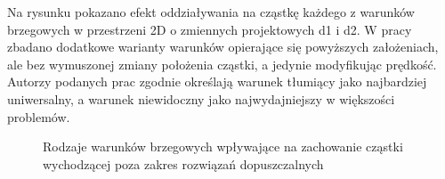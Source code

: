 Na rysunku pokazano efekt oddziaływania na cząstkę każdego z warunków brzegowych w przestrzeni 2D o zmiennych projektowych d1 i d2. W pracy \parencite{Xu2007} zbadano dodatkowe warianty warunków opierające się powyższych założeniach, ale bez wymuszonej zmiany położenia cząstki, a jedynie modyfikując prędkość. Autorzy podanych prac zgodnie określają warunek tłumiący jako najbardziej uniwersalny, a warunek niewidoczny jako najwydajniejszy w większości problemów.
\begin{figure}[hbt!]
	\centering
	\captionsetup{justification=centering}
	\caption{Rodzaje warunków brzegowych wpływające na zachowanie cząstki wychodzącej poza zakres rozwiązań dopuszczalnych}
	\label{fig: pso_bounds_types}
\end{figure}
